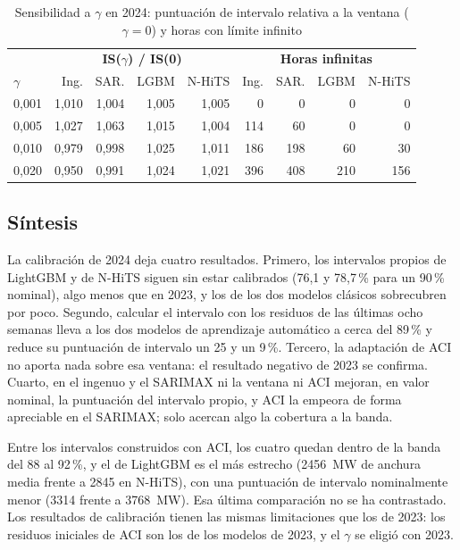 \begin{table}[htbp]
	\centering
	\caption{Sensibilidad a $\gamma$ en 2024: puntuación de intervalo relativa a la ventana ($\gamma = 0$) y horas con límite infinito}
	\label{tab:final-gamma}
	\small
	\begin{tabular}{lrrrrrrrr}
		\hline
		 & \multicolumn{4}{c}{\textbf{IS($\gamma$) / IS(0)}} & \multicolumn{4}{c}{\textbf{Horas infinitas}} \\
		$\gamma$ & Ing. & SAR. & LGBM & N-HiTS & Ing. & SAR. & LGBM & N-HiTS \\
		\hline
		0,001 & 1,010 & 1,004 & 1,005 & 1,005 & 0 & 0 & 0 & 0 \\
		0,005 & 1,027 & 1,063 & 1,015 & 1,004 & 114 & 60 & 0 & 0 \\
		0,010 & 0,979 & 0,998 & 1,025 & 1,011 & 186 & 198 & 60 & 30 \\
		0,020 & 0,950 & 0,991 & 1,024 & 1,021 & 396 & 408 & 210 & 156 \\
		\hline
	\end{tabular}
\end{table}


\subsection{Síntesis}\label{sec:final-cal-sintesis}

La calibración de 2024 deja cuatro resultados. Primero, los intervalos propios de
LightGBM y de N-HiTS siguen sin estar calibrados (76,1 y 78,7\,\% para un 90\,\%
nominal), algo menos que en 2023, y los de los dos modelos clásicos sobrecubren
por poco. Segundo, calcular el intervalo con los residuos de las últimas ocho
semanas lleva a los dos modelos de aprendizaje automático a cerca del 89\,\% y
reduce su puntuación de intervalo un 25 y un 9\,\%. Tercero, la adaptación de ACI
no aporta nada sobre esa ventana: el resultado negativo de 2023 se confirma.
Cuarto, en el ingenuo y el SARIMAX ni la ventana ni ACI mejoran, en valor nominal,
la puntuación del intervalo propio, y ACI la empeora de forma apreciable en el
SARIMAX; solo acercan algo la cobertura a la banda.

Entre los intervalos construidos con ACI, los cuatro quedan dentro de la banda
del 88 al 92\,\%, y el de LightGBM es el más estrecho (2456~MW de anchura media
frente a 2845 en N-HiTS), con una puntuación de intervalo nominalmente menor
(3314 frente a 3768~MW). Esa última comparación no se ha contrastado. Los
resultados de calibración tienen las mismas limitaciones que los de 2023: los
residuos iniciales de ACI son los de los modelos de 2023, y el $\gamma$ se eligió
con 2023.


